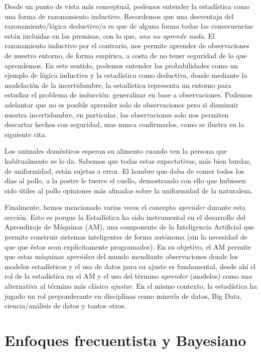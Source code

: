 Desde un punto de vista más conceptual, podemos entender la estadística como una forma de razonamiento inductivo. Recordemos que una desventaja del razonamiento/lógica deductivo/a es que de alguna forma todas las consecuencias están incluidas en las premisas, con lo que, \emph{uno no aprende nada}. El razonamiento inductivo por el contrario, nos permite aprender de observaciones de nuestro entorno, de forma empírica, a costa de no tener seguridad de lo que aprendemos. En este sentido, podemos entender las probabilidades como un ejemplo de lógica inductiva y la estadística como deductiva, donde mediante la modelación de la incertidumbre, la estadística representa un entorno para estudiar el problema de inducción: generalizar en base a observaciones. Podemos adelantar que no es posible aprender solo de observaciones pero sí disminuir nuestra incertidumbre, en particular, las observaciones solo nos permiten descartar hechos con seguridad, mas nunca confirmarlos, como se ilustra en la siguiente cita. 

\begin{displayquote}   
Los animales domésticos esperan su alimento
cuando ven la persona que habitualmente se lo da. Sabemos que todas estas
expectativas, más bien burdas, de uniformidad, están sujetas a error. El hombre que
daba de comer todos los días al pollo, a la postre le tuerce el cuello, demostrando con
ello que hubiesen sido útiles al pollo opiniones más afinadas sobre la uniformidad de la naturaleza.
\end{displayquote}

Finalmente, hemos mencionado varias veces el concepto \emph{aprender} durante esta sección. Esto es porque la Estadística ha sido instrumental en el desarrollo del Aprendizaje de Máquinas (AM),  una componente de la Inteligencia Artificial que permite construir sistemas inteligentes de forma autónoma (sin la necesidad de que que éstos sean explícitamente programados). En su objetivo, el AM permite que estas máquinas \emph{aprendan} del mundo mendiante observaciones donde los modelos estadísticos y el uso de datos para su ajuste es fundamental, desde ahí el rol de la estadística en el AM y el uso del término \emph{aprender} (modelos) como una alternativa al término más clásico \emph{ajustar}. En el mismo contexto, la estadística ha jugado un rol preponderante en disciplinas como minería de datos, Big Data, ciencia/análisis de datos y tantos otros. 

\section{Enfoques frecuentista y Bayesiano}

